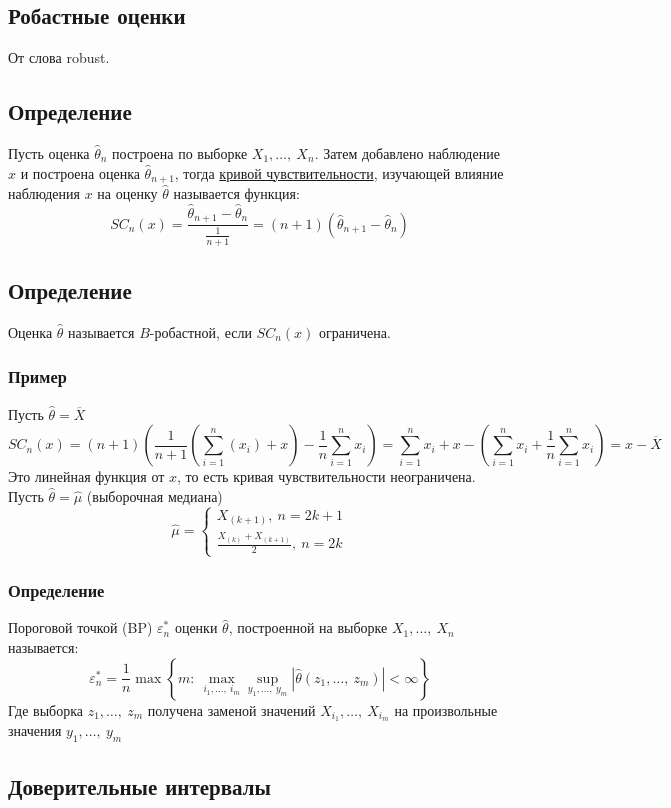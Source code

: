 \documentclass[12pt, a4paper]{article}
\newcommand{\sion}{\sum\limits_{i = 1}^{n}}
\begin{document}
\subsection*{Робастные оценки}
От слова robust.\\
\subsection*{Определение}
Пусть оценка $\hat{\theta}_n$ построена по выборке $X_1,\dots,\ X_n$. Затем добавлено наблюдение $x$ и построена оценка $\hat{\theta}_{n + 1}$, тогда \underline{кривой чувствительности}, изучающей влияние наблюдения $x$ на оценку $\hat{\theta}$ называется функция:
\[S C_n (x) = \frac{\hat{\theta}_{n + 1} - \hat{\theta}_n}{\frac{1}{n + 1}} = (n + 1)\left( \hat{\theta}_{n + 1} - \hat{\theta}_n \right)\]
\subsection*{Определение}
Оценка $\hat{\theta}$ называется $B$-робастной, если $SC_n(x)$ ограничена.
\subsubsection*{Пример}
Пусть $\hat{\theta} = \overline{X}$
\[SC_n(x) = (n + 1)\left( \frac{1}{n + 1} \left( \sion (x_i) + x \right) - \frac{1}{n} \sion x_i \right) = \sion x_i + x - \left( \sion x_i + \frac{1}{n} \sion x_i \right) = x - \overline{X}\]
Это линейная функция от $x$, то есть кривая чувствительности неограничена.\\
Пусть $\hat{\theta} = \hat{\mu}$ (выборочная медиана)
\[\hat{\mu} = \begin{cases}
    X_{(k + 1)},\ n = 2k + 1\\
    \frac{X_{(k)} + X_{(k + 1)}}{2},\ n = 2k
\end{cases}\]
\subsubsection*{Определение}
Пороговой точкой (BP) $\varepsilon^*_n$ оценки $\hat{\theta}$, построенной на выборке $X_1,\dots,\ X_n$ называется:
\[\varepsilon^*_n = \frac{1}{n} \max\left\{ m:\ \max_{i_1,\dots,\ i_m} \sup_{y_1,\dots,\ y_m} |\hat{\theta} (z_1,\dots,\ z_m)| < \infty \right\}\]
Где выборка $z_1,\dots,\ z_m$ получена заменой значений $X_{i_1},\dots,\ X_{i_m}$ на произвольные значения $y_1,\dots,\ y_m$
\subsection*{Доверительные интервалы}
\end{document}
